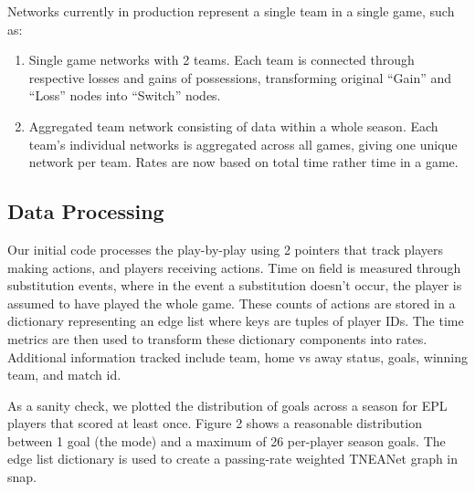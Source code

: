 Networks currently in production represent a single team in a single game, such as:

\begin{enumerate}
    \item Single game networks with 2 teams. Each team is connected through respective losses and gains of possessions, transforming original ``Gain'' and ``Loss'' nodes into ``Switch'' nodes.

    \item Aggregated team network consisting of data within a whole season. Each team's individual networks is aggregated across all games, giving one unique network per team. Rates are now based on total time rather time in a game. 
\end{enumerate}

\subsection{Data Processing}

Our initial code processes the play-by-play using 2 pointers that track players making actions, and players receiving actions. Time on field is measured through substitution events, where in the event a substitution doesn’t occur, the player is assumed to have played the whole game. These counts of actions are stored in a dictionary representing an edge list where keys are tuples of player IDs. The time metrics are then used to transform these dictionary components into rates. Additional information tracked include team, home vs away status, goals, winning team, and match id. 

As a sanity check, we plotted the distribution of goals across a season for EPL players that scored at least once. Figure 2 shows a reasonable distribution between 1 goal (the mode) and a maximum of 26 per-player season goals. The edge list dictionary is used to create a passing-rate weighted TNEANet graph in snap. 




